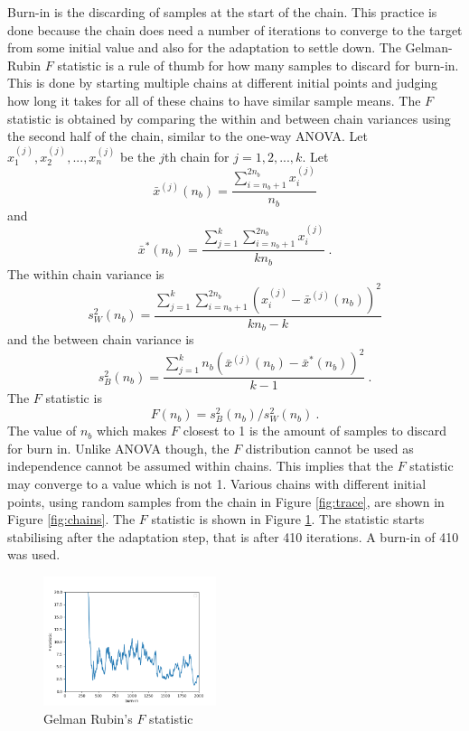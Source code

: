 \documentclass[10pt]{proc}
\newcommand{\dotdotdot}{...}
\begin{document}
Burn-in \citep{geyer1992practical, geyer2011mcmc} is the discarding of samples at the start of the chain. This practice is done because the chain does need a number of iterations to converge to the target from some initial value and also for the adaptation to settle down. The Gelman-Rubin $F$ statistic \citep{gelman1992inference} is a rule of thumb for how many samples to discard for burn-in. This is done by starting multiple chains at different initial points and judging how long it takes for all of these chains to have similar sample means. The $F$ statistic is obtained by comparing the within and between chain variances using the second half of the chain, similar to the one-way ANOVA. Let $x_1^{(j)}, x_2^{(j)},\dotdotdot,x_n^{(j)}$ be the $j$th chain for $j=1,2,\dotdotdot,k$. Let
\begin{equation}
\bar{x}^{(j)}(n_b)=\dfrac{\sum_{i=n_b+1}^{2n_b}x_i^{(j)}}{n_b}
\end{equation}
and
\begin{equation}
\bar{x}^*(n_b) = \dfrac{\sum_{j=1}^k\sum_{i=n_b+1}^{2n_b}x_i^{(j)}}{kn_b}
\ .
\end{equation}
The within chain variance is
\begin{equation}
s_W^2(n_b) = \dfrac{
  \sum_{j=1}^k \sum_{i=n_b+1}^{2n_b} \left(
    x_i^{(j)} - \bar{x}^{(j)}(n_b)
  \right)^2
}
{
  kn_b - k
}
\end{equation}
and the between chain variance is
\begin{equation}
s_B^2(n_b) = \dfrac{
  \sum_{j=1}^k  n_b \left(
    \bar{x}^{(j)}(n_b) - \bar{x}^*(n_b)
  \right)^2
}
{
  k-1
}
\ .
\end{equation}
The $F$ statistic is
\begin{equation}
F(n_b) = s_B^2(n_b) / s_W^2(n_b) \ .
\end{equation}
The value of $n_b$ which makes $F$ closest to 1 is the amount of samples to discard for burn in. Unlike ANOVA though, the $F$ distribution cannot be used as independence cannot be assumed within chains. This implies that the $F$ statistic may converge to a value which is not 1. Various chains with different initial points, using random samples from the chain in Figure \ref{fig:trace}, are shown in Figure \ref{fig:chains}. The $F$ statistic is shown in Figure \ref{fig:grs}.  The statistic starts stabilising after the adaptation step, that is after 410 iterations. A burn-in of 410 was used.

\begin{figure}[ht]
  \centering
  \includegraphics[width=0.45\textwidth]{f.png}
  \caption{Gelman Rubin's $F$ statistic}
  \label{fig:grs}
\end{figure}
\end{document}
